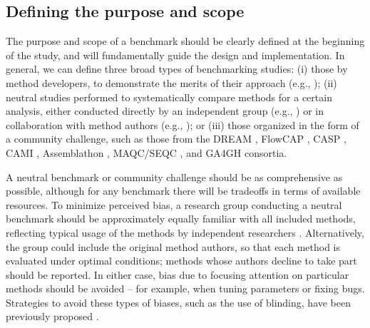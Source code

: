 \subsection{Defining the purpose and scope}

The purpose and scope of a benchmark should be clearly defined at the beginning of the study, and will fundamentally guide the design and implementation. In general, we can define three broad types of benchmarking studies: (i) those by method developers, to demonstrate the merits of their approach (e.g., \cite{weber_diffcytdifferentialdiscovery_2019,nowicka_drimseqdirichletmultinomialframework_2016,levine_datadrivenphenotypicdissection_2015,zhou_robustlydetectingdifferential_2014,law_voomprecisionweights_2014}); (ii) neutral studies performed to systematically compare methods for a certain analysis, either conducted directly by an independent group (e.g., \cite{saelens_comparisonsinglecelltrajectory_2019,duo_systematicperformanceevaluation_2018,soneson_biasrobustnessscalability_2018,saelens_comprehensiveevaluationmodule_2018,weber_comparisonclusteringmethods_2016,korthauer_practicalguidemethods_2019,freytag_comparisonclusteringtools_2018,baruzzo_simulationbasedcomprehensivebenchmarking_2017,kanitz_comparativeassessmentmethods_2015,soneson_comparisonmethodsdifferential_2013,rapaport_comprehensiveevaluationdifferential_2013,dillies_comprehensiveevaluationnormalization_2013}) or in collaboration with method authors (e.g., \cite{sage_quantitativeevaluationsoftware_2015}); or (iii) those organized in the form of a community challenge, such as those from the DREAM \cite{weirauch_evaluationmethodsmodeling_2013,costello_communityeffortassess_2014,kuffner_crowdsourcedanalysisclinical_2015,ewing_combiningtumorgenome_2015,hill_inferringcausalmolecular_2016}, FlowCAP \cite{aghaeepour_criticalassessmentautomated_2013,aghaeepour_benchmarkevaluationalgorithms_2016}, CASP \cite{moult_criticalassessmentmethods_2018,moult_criticalassessmentmethods_2016}, CAMI \cite{sczyrba_criticalassessmentmetagenome_2017}, Assemblathon \cite{earl_assemblathoncompetitiveassessment_2011,bradnam_assemblathonevaluatingnovo_2013}, MAQC/SEQC \cite{maqcconsortium_microarrayqualitycontrol_2006,shi_microarrayqualitycontrol_2010,seqc_comprehensiveassessmentrnaseq_2014}, and GA4GH \cite{krusche_bestpracticesbenchmarking_2019} consortia.

A neutral benchmark or community challenge should be as comprehensive as possible, although for any benchmark there will be tradeoffs in terms of available resources. To minimize perceived bias, a research group conducting a neutral benchmark should be approximately equally familiar with all included methods, reflecting typical usage of the methods by independent researchers \cite{boulesteix_pleaneutralcomparison_2013}. Alternatively, the group could include the original method authors, so that each method is evaluated under optimal conditions; methods whose authors decline to take part should be reported. In either case, bias due to focusing attention on particular methods should be avoided -- for example, when tuning parameters or fixing bugs. Strategies to avoid these types of biases, such as the use of blinding, have been previously proposed \cite{boulesteix_evidencebasedcomputationalstatistics_2017}.

